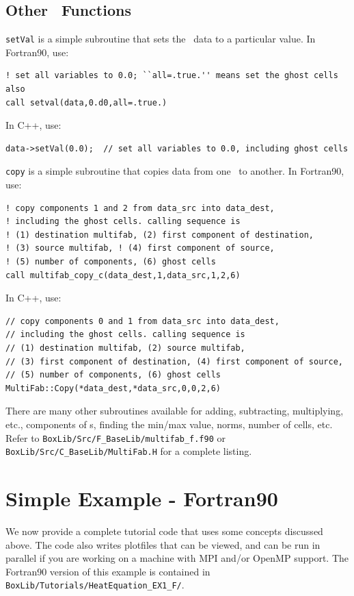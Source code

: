 \subsection{Other \MultiFab\ Functions}
{\tt setVal} is a simple subroutine that sets the \MultiFab\ data to a particular value.
In Fortran90, use:
\begin{lstlisting}[backgroundcolor=\color{light-green}]
! set all variables to 0.0; ``all=.true.'' means set the ghost cells also
call setval(data,0.d0,all=.true.)
\end{lstlisting}
In C++, use:
\begin{lstlisting}[backgroundcolor=\color{light-blue}]
data->setVal(0.0);  // set all variables to 0.0, including ghost cells
\end{lstlisting}
{\tt copy} is a simple subroutine that copies data from one \MultiFab\ to another.
In Fortran90, use:
\begin{lstlisting}[backgroundcolor=\color{light-green}]
! copy components 1 and 2 from data_src into data_dest, 
! including the ghost cells. calling sequence is 
! (1) destination multifab, (2) first component of destination, 
! (3) source multifab, ! (4) first component of source, 
! (5) number of components, (6) ghost cells
call multifab_copy_c(data_dest,1,data_src,1,2,6)
\end{lstlisting}
In C++, use:
\begin{lstlisting}[backgroundcolor=\color{light-blue}]
// copy components 0 and 1 from data_src into data_dest, 
// including the ghost cells. calling sequence is 
// (1) destination multifab, (2) source multifab, 
// (3) first component of destination, (4) first component of source, 
// (5) number of components, (6) ghost cells
MultiFab::Copy(*data_dest,*data_src,0,0,2,6)
\end{lstlisting}
There are many other subroutines available for adding, subtracting, multiplying, etc.,
components of \MultiFab s, finding the min/max value, norms, number of cells, etc.
Refer to {\tt BoxLib/Src/F\_BaseLib/multifab\_f.f90} or 
{\tt BoxLib/Src/C\_BaseLib/MultiFab.H} for a complete listing.

\section{Simple Example - Fortran90}
We now provide a complete tutorial code that uses some concepts discussed above.
The code also writes plotfiles that can be viewed, and can be run in parallel if you
are working on a machine with MPI and/or OpenMP support.  The Fortran90 version of this 
example is contained in {\tt BoxLib/Tutorials/HeatEquation\_EX1\_F/}.\\

